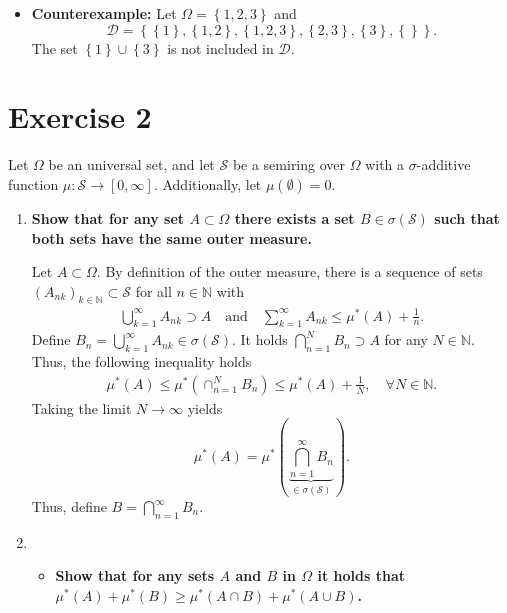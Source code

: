 \documentclass{article}
\begin{document}
\begin{itemize}
    \item \textbf{Counterexample:} Let $\Omega = \left\{1,2,3\right\}$ and $$\mathcal{D} = \left\{ \left\{ 1\right\}, \left\{ 1,2\right\}, \left\{ 1,2,3 \right\}, \left\{ 2, 3 \right\}, \left\{ 3 \right\}, \left\{ \right\} \right\}.$$
    The set $\left\{ 1 \right\} \cup \left\{ 3 \right\}$ is not included in $\mathcal{D}$.
\end{itemize}


\section*{Exercise 2}
Let $\Omega$ be an universal set, and let $\mathcal S$ be a semiring over $\Omega$ with a $\sigma$-additive function $\mu: \mathcal S \to [0, \infty]$. Additionally, let $\mu(\emptyset) = 0$.
\begin{enumerate}[label=(\roman*)]
    \item \textbf{Show that for any set $A \subset \Omega$ there exists a set $B \in \sigma(\mathcal{S})$ such that both sets have the same outer measure.}
    

    Let $A \subset \Omega$. By definition of the outer measure, there is a sequence of sets $(A_{nk})_{k \in \mathbb{N}} \subset \mathcal{S}$ for all $n \in \mathbb{N}$ with 
    \begin{align*}
        \bigcup_{k=1}^{\infty} A_{nk} \supset A \quad \text{and} \quad \sum^\infty_{k=1} A_{nk} \leq \mu^*(A) + \frac{1}{n}.
    \end{align*}
    Define $B_n = \bigcup_{k=1}^\infty A_{nk} \in \sigma(\mathcal S)$. It holds $\bigcap_{n = 1}^N B_n \supset A$ for any $N \in \mathbb{N}$. Thus, the following inequality holds 
    \begin{align*}
        \mu^*(A) \leq \mu^*(\cap^N_{n=1} B_n) \leq \mu^*(A) + \frac{1}{N}, \quad \forall N \in \mathbb{N}.
    \end{align*}
    Taking the limit $N \to \infty$ yields $$\mu^*(A) = \mu^*(\underbrace{\bigcap_{n=1}^\infty B_n}_{\in \sigma(\mathcal{S})}).$$ Thus, define $B = \bigcap_{n=1}^\infty B_n$.



    \item \begin{itemize}
        \item \textbf{Show that for any sets $A$ and $B$ in $\Omega$ it holds that $\mu^*(A) + \mu^*(B) \geq \mu^*(A \cap B) + \mu^*(A \cup B)$.}
    

\end{itemize}
\end{enumerate}
\end{document}
